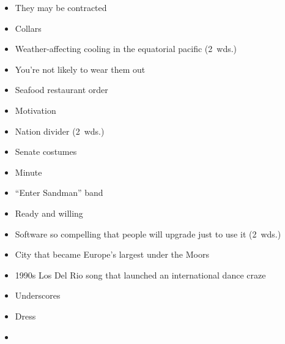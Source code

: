 {\begin{itemize}
    \end{itemize}
  \item
    \begin{itemize}
      \item
        They may be contracted
      \item
        Collars
    \end{itemize}
  \item
    \begin{itemize}
      \item
        Weather-affecting cooling in the equatorial pacific (2~wds.)
      \item
        You're not likely to wear them out
    \end{itemize}
  \item
    \begin{itemize}
      \item
        Seafood restaurant order
      \item
        Motivation
    \end{itemize}
  \item
    \begin{itemize}
      \item
        Nation divider (2~wds.)
      \item
        Senate costumes
    \end{itemize}
  \item
    \begin{itemize}
      \item
        Minute
      \item
        ``Enter Sandman'' band
    \end{itemize}
  \item
    \begin{itemize}
      \item
        Ready and willing
      \item
        Software so compelling that people will upgrade just to use it (2~wds.)
    \end{itemize}
}{%
  \item
    \begin{itemize}
      \item
        City that became Europe's largest under the Moors
      \item
        1990s Los Del Rio song that launched an international dance craze
      \item
        Underscores
      \item
        Dress
      \item

\end{itemize}}
